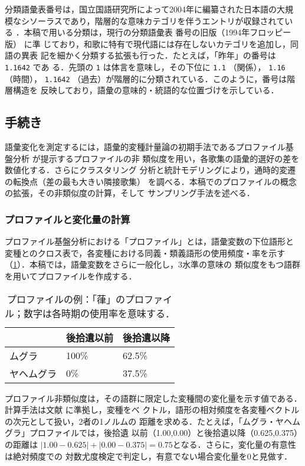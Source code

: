 \documentclass[submit]{ipsj}
\renewcommand{\ref}{\cref}
\begin{document}
分類語彙表番号は，国立国語研究所によって2004年に編纂された日本語の大規
模なシソーラスであり，階層的な意味カテゴリを伴うエントリが収録されてい
る \cite{Asahara2022CHJWLSP}．本稿で用いる分類は，現行の分類語彙表
番号の旧版（1994年フロッピー版）\cite{nakano1994Bunruigoihyo} に準
じており，和歌に特有で現代語には存在しないカテゴリを追加し，同語の異表
記を細かく分類する拡張も行った．たとえば，「昨年」の番号は \texttt{1.1642} であ
る．先頭の \texttt{1} は体言を意味し，その下位に \texttt{1.1} （関係）， \texttt{1.16} （時間），
\texttt{1.1642} （過去）が階層的に分類されている．このように，番号は階層構造を
反映しており，語彙の意味的・統語的な位置づけを示している．
\subsection{手続き\label{orgfdc718d}}
\label{sec:org46ad929}
語彙変化を測定するには，語彙的変種計量論の初期手法であるプロファイル基
盤分析 \cite{Speelman2003Profilebased} が提示するプロファイルの非
類似度を用い，各歌集の語彙的選好の差を数値化する．さらにクラスタリング
分析と統計モデリングにより，通時的変遷の転換点（差の最も大きい隣接歌集）
を調べる．本稿でのプロファイルの概念の拡張，その非類似度の計算，そして
サンプリング手法を述べる．
\subsubsection{プロファイルと変化量の計算\label{org49b1ec8}}
\label{sec:org706a2dd}
プロファイル基盤分析における「プロファイル」とは，語彙変数の下位語形と
変種とのクロス表で，各変種における同義・類義語形の使用頻度・率を示す
（\ref{tab:orga3a510c}）．本稿では，語彙変数をさらに一般化し，3水準の意味の
類似度をもつ語群を用いてプロファイルを作成する．

\begin{table}[t]
\caption{\label{tab:orga3a510c}プロファイルの例：「葎」のプロファイル；数字は各時期の使用率を意味する．}
\centering
\begin{tabular}{lll}
 & 後拾遺以前 & 後拾遺以降\\
\hline
ムグラ & 100\% & 62.5\%\\
ヤヘムグラ & 0\% & 37.5\%\\
\end{tabular}
\end{table}

プロファイル非類似度は，その語群に限定した変種間の変化量を示す値である．
計算手法は文献 \cite{Speelman2003Profilebased}に準拠し，変種をベ
クトル，語形の相対頻度を各変種ベクトルの次元として扱い，2者の1ノルムの
距離を求める．たとえば，「ムグラ・ヤヘムグラ」プロファイルでは，後拾遺
以前（1.00,0.00）と後拾遺以降（0.625,0.375）の距離は \(|1.00 -
0.625|+|0.00-0.375|=0.75\)となる．さらに，変化量の有意性は絶対頻度での
対数尤度検定で判定し，有意でない場合変化量を0と見做す．
\end{document}
